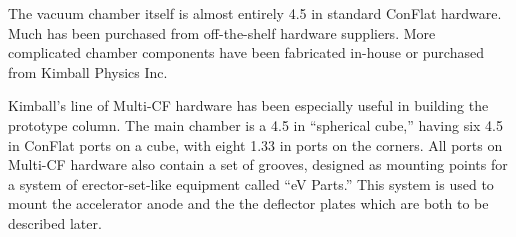 The vacuum chamber itself is almost entirely 4.5 in standard ConFlat hardware.
Much has been purchased from off-the-shelf hardware suppliers.
More complicated chamber components have been fabricated in-house or purchased from Kimball Physics Inc.

Kimball's line of Multi-CF hardware has been especially useful in building the prototype column.
The main chamber is a 4.5 in ``spherical cube,'' having six 4.5 in ConFlat ports on a cube, with eight 1.33 in ports on the corners.
All ports on Multi-CF hardware also contain a set of grooves, designed as mounting points for a system of erector-set-like equipment called ``eV Parts.''
This system is used to mount the accelerator anode and the the deflector plates which are both to be described later.


